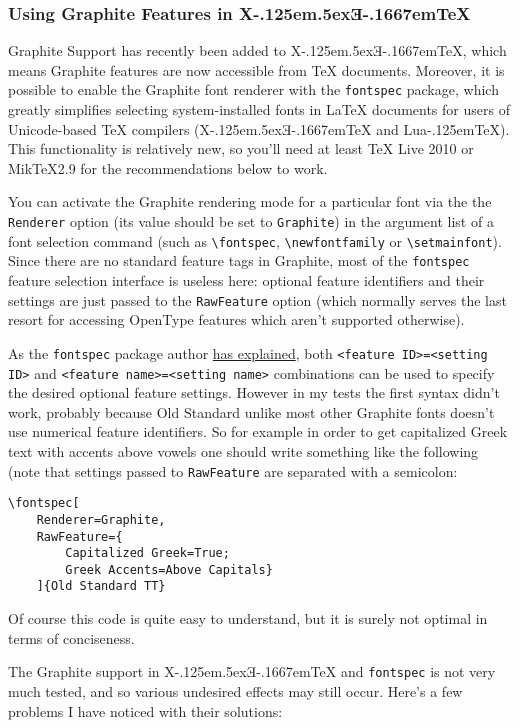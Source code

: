 \documentclass[12pt,a4paper,openany]{book}
\providecommand{\XeTeX}{X\kern-.125em\lower.5ex\hbox{Ǝ}\kern-.1667em\TeX}
\providecommand{\LuaTeX}{Lua\kern-.125em\TeX}
\begin{document}
\subsubsection{Using Graphite Features in \XeTeX}

Graphite Support has recently been added to \XeTeX, which means Graphite
features are now accessible from \TeX{} documents. Moreover, it is possible
to enable the Graphite font renderer with the \texttt{fontspec} package,
which greatly simplifies selecting system-installed fonts in \LaTeX{}
documents for users of Unicode-based \TeX{} compilers (\XeTeX{} and \LuaTeX).
This functionality is relatively new, so you'll need at least \TeX{} Live 2010
or Mik\TeX 2.9 for the recommendations below to work.

You can activate the Graphite rendering mode for a particular font via the
the \texttt{Renderer} option (its value should be set to \texttt{Graphite})
in the argument list of a font selection command (such as \verb|\fontspec|,
\verb|\newfontfamily| or \verb|\setmainfont|). Since there are no standard
feature tags in Graphite, most of the \texttt{fontspec} feature selection
interface is useless here: optional feature identifiers and their settings are
just passed to the \texttt{RawFeature} option (which normally serves
the last resort for accessing OpenType features which aren't supported otherwise).

As the \texttt{fontspec} package author
\href{http://tex.stackexchange.com/questions/4324/using-graphite-fonts-on-xelatex}{has
explained}, both \texttt{<feature ID>=<setting ID>} and \texttt{<feature name>=<setting name>}
combinations can be used to specify the desired optional feature settings.
However in my tests the first syntax didn't work, probably because Old Standard
unlike most other Graphite fonts doesn't use numerical feature identifiers. So
for example in order to get capitalized Greek text with accents above vowels one
should write something like the following (note that settings passed to
\texttt{RawFeature} are separated with a semicolon:

\begin{verbatim}
\fontspec[
    Renderer=Graphite,
    RawFeature={
        Capitalized Greek=True;
        Greek Accents=Above Capitals}
    ]{Old Standard TT}
\end{verbatim}

Of course this code is quite easy to understand, but it is surely not optimal
in terms of conciseness.

The Graphite support in \XeTeX{} and \texttt{fontspec} is not very much tested,
and so various undesired effects may still occur. Here's a few problems I have
noticed with their solutions:
\end{document}
